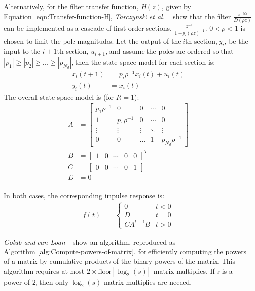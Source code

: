 \documentclass[a4paper,twoside,10pt,english]{report}
\begin{document}
Alternatively, for the filter transfer function, 
$H\left(z\right)$, given by Equation~\ref{eqn:Transfer-function-H}, 
\emph{Tarczynski et al.} 
~\cite[Appendix 1]{TarczynskiCainHermanowiczRojewski_WISEMethodDesignIIRFilters}
show that the filter $\frac{z^{-N_d}}{D\left(\rho z\right)}$ can be implemented
as a cascade of first order sections,
$\frac{z^{-1}}{1-p_{i}\left(\rho z\right)^{-1}}$. $0<\rho<1$ is 
chosen to limit the pole magnitudes. Let the output of the $i$th 
section, $y_{i}$, be the input to the $i+1$th section, $u_{i+1}$, and 
assume the poles are ordered so that 
$\left|p_{1}\right|\ge\left|p_{2}\right|\ge\hdots\ge\left|p_{N_{d}}\right|$,
then the state space model for each section is:
\begin{align*}
  x_{i}\left(t+1\right) &= p_{i}\rho^{-1}x_{i}\left(t\right)+u_{i}\left(t\right)\\
  y_{i}\left(t\right)   &= x_{i}\left(t\right)
\end{align*}
The overall state space model is (for $R=1$):
\begin{align*}
A &= \left[\begin{array}{ccccc}
p_{1}\rho^{-1} & 0             & 0      & \cdots & 0\\
1             & p_{1}\rho^{-1} & 0      & \cdots & 0\\
\vdots        & \vdots        & \vdots & \ddots & \vdots\\
0             & 0             & \hdots & 1      & p_{N_{d}}\rho^{-1}
\end{array}\right]\\
B &= \left[\begin{array}{ccccc}1 & 0 & \cdots & 0 & 0\end{array}\right]^{T}\\
C &= \left[\begin{array}{ccccc}0 & 0 & \cdots & 0 & 1\end{array}\right]\\
D &= 0\\
\end{align*} 

In both cases, the corresponding impulse response is:
\begin{align*}
f\left(t\right) &= \begin{cases}
0 & t<0\\
D & t=0\\
CA^{t-1}B & t>0
\end{cases}
\end{align*}

\emph{Golub and van Loan} 
~\cite[Algorithm 11.2.2]{GolubVanLoan_MatrixComputations} show an algorithm,
reproduced as Algorithm~\ref{alg:Compute-powers-of-matrix}, 
for efficiently computing the powers of a matrix by cumulative products of the 
binary powers of the matrix. This algorithm requires at most 
$2\times\text{floor}\left[\log_{2}\left(s\right)\right]$ matrix multiplies. 
If $s$ is a power of $2$, then only $\log_{2}\left(s\right)$ matrix multiplies
are needed.
\end{document}
